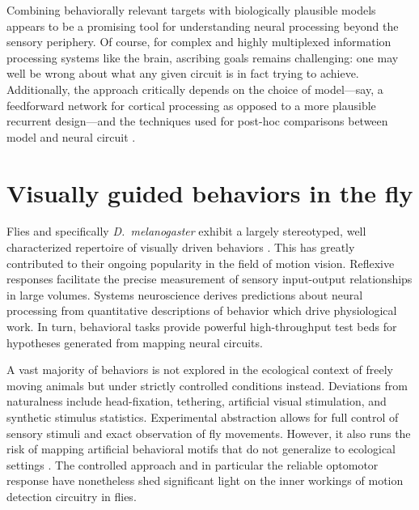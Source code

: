 Combining behaviorally relevant targets with biologically plausible models appears to be a promising tool for understanding neural processing beyond the sensory periphery. Of course, for complex and highly multiplexed information processing systems like the brain, ascribing goals remains challenging: one may well be wrong about what any given circuit is in fact trying to achieve. Additionally, the approach critically depends on the choice of model---say, a feedforward network for cortical processing as opposed to a more plausible recurrent design---and the techniques used for post-hoc comparisons between model and neural circuit \citep{Yamins:2016hg}.


\section{Visually guided behaviors in the fly}

Flies and specifically \textit{D.\ melanogaster} exhibit a largely stereotyped, well characterized repertoire of visually driven behaviors \citep{Borst:2014kl}. This has greatly contributed to their ongoing popularity in the field of motion vision. Reflexive responses facilitate the precise measurement of sensory input-output relationships in large volumes. Systems neuroscience derives predictions about neural processing from quantitative descriptions of behavior which drive physiological work. In turn, behavioral tasks provide powerful high-throughput test beds for hypotheses generated from mapping neural circuits.

A vast majority of behaviors is not explored in the ecological context of freely moving animals but under strictly controlled conditions instead. Deviations from naturalness include head-fixation, tethering, artificial visual stimulation, and synthetic stimulus statistics. Experimental abstraction allows for full control of sensory stimuli and exact observation of fly movements. However, it also runs the risk of mapping artificial behavioral motifs that do not generalize to ecological settings \citep{Krakauer:2017aa}. The controlled approach and in particular the reliable optomotor response have nonetheless shed significant light on the inner workings of motion detection circuitry in flies.

